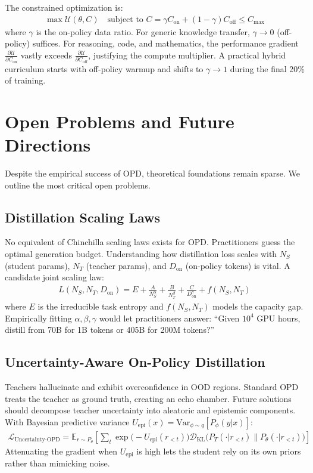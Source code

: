 \documentclass{article} %
\begin{document}
The constrained optimization is:
\begin{align}
\max \mathcal{U}(\theta, C) \quad \text{subject to } C = \gamma C_{\text{on}} + (1 - \gamma) C_{\text{off}} \le C_{\text{max}}
\end{align}
where $\gamma$ is the on-policy data ratio. For generic knowledge transfer, $\gamma \to 0$ (off-policy) suffices. For reasoning, code, and mathematics, the performance gradient $\frac{\partial \mathcal{U}}{\partial C_{\text{on}}}$ vastly exceeds $\frac{\partial \mathcal{U}}{\partial C_{\text{off}}}$, justifying the compute multiplier. A practical hybrid curriculum starts with off-policy warmup and shifts to $\gamma \to 1$ during the final 20\% of training.

\section{Open Problems and Future Directions}
\label{sec:future}

Despite the empirical success of OPD, theoretical foundations remain sparse. We outline the most critical open problems.

\subsection{Distillation Scaling Laws}
No equivalent of Chinchilla scaling laws exists for OPD. Practitioners guess the optimal generation budget. Understanding how distillation loss scales with $N_S$ (student params), $N_T$ (teacher params), and $D_{\text{on}}$ (on-policy tokens) is vital. A candidate joint scaling law:
\begin{align}
L(N_S, N_T, D_{\text{on}}) = E + \frac{A}{N_S^\alpha} + \frac{B}{N_T^\beta} + \frac{C}{D_{\text{on}}^\gamma} + f(N_S, N_T) \label{eq:scaling}
\end{align}
where $E$ is the irreducible task entropy and $f(N_S, N_T)$ models the capacity gap. Empirically fitting $\alpha, \beta, \gamma$ would let practitioners answer: ``Given $10^4$ GPU hours, distill from 70B for 1B tokens or 405B for 200M tokens?''

\subsection{Uncertainty-Aware On-Policy Distillation}
Teachers hallucinate and exhibit overconfidence in OOD regions. Standard OPD treats the teacher as ground truth, creating an echo chamber. Future solutions should decompose teacher uncertainty into aleatoric and epistemic components. With Bayesian predictive variance $U_{\text{epi}}(x) = \text{Var}_{\phi \sim q}[P_\phi(y|x)]$:
\begin{align}
\mathcal{L}_{\text{Uncertainty-OPD}} = \mathbb{E}_{r \sim P_\theta} \left[ \sum_t \exp\big(-U_{\text{epi}}(r_{<t})\big) \mathcal{D}_{\text{KL}}\Big(P_T(\cdot | r_{<t}) \parallel P_\theta(\cdot | r_{<t})\Big) \right]
\end{align}
Attenuating the gradient when $U_{\text{epi}}$ is high lets the student rely on its own priors rather than mimicking noise.
\end{document}
